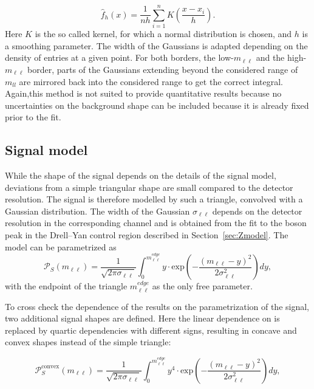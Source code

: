 \begin{equation}
\hat{f}_h(x) = \frac{1}{nh}\sum\limits_{i=1}^n K(\frac{x-x_i}{h}).
\end{equation}
Here $K$ is the so called kernel, for which a normal distribution is chosen, and $h$ is a smoothing parameter\cite{kernelDensity}. The width of the Gaussians is adapted depending on the density of entries at a given point. For both borders, the low-$m_{\ell\ell}$ and the high-$m_{\ell\ell}$ border, parts of the Gaussians extending beyond the considered range of $m_{ll}$ are mirrored back into the considered range to get the correct integral. Again,this method is not suited to provide quantitative results because no uncertainties on the background shape can be included because it is already fixed prior to the fit.  



\subsection{Signal model}
\label{sec:sigModel}
While the shape of the signal depends on the details of the signal model, deviations from a simple triangular shape are small compared to the detector resolution. The signal is therefore modelled by such a triangle, convolved with a Gaussian distribution. The width of the Gaussian $\sigma_{\ell\ell}$ depends on the detector resolution in the corresponding channel and is obtained from the fit to the \Z boson peak in the Drell--Yan control region described in Section~\ref{sec:Zmodel}. The model can be parametrized as
\begin{equation}
 {\mathcal{P}}_{S}(m_{\ell\ell}) = \frac{1}{\sqrt{2\pi\sigma_{\ell\ell}}} \int_{0}^{m_{\ell\ell}^{edge}} y \cdot \textrm{exp}\left( -\frac{(m_{\ell\ell}-y)^2}{2\sigma_{\ell\ell}^{2}}\right) dy,
\end{equation}
with the endpoint of the triangle $m_{\ell\ell}^{edge}$ as the only free parameter.

To cross check the dependence of the results on the parametrization of the signal, two additional signal shapes are defined. Here the linear dependence on \mll is replaced by quartic dependencies with different signs, resulting in concave and convex shapes instead of the simple triangle:

\begin{equation}
\label{eq:convex}
 {\mathcal{P}}^{\text{convex}}_{S}(m_{\ell\ell}) = \frac{1}{\sqrt{2\pi\sigma_{\ell\ell}}} \int_{0}^{m_{\ell\ell}^{edge}} y^4 \cdot \textrm{exp}\left( -\frac{(m_{\ell\ell}-y)^2}{2\sigma_{\ell\ell}^{2}}\right) dy,
\end{equation}

